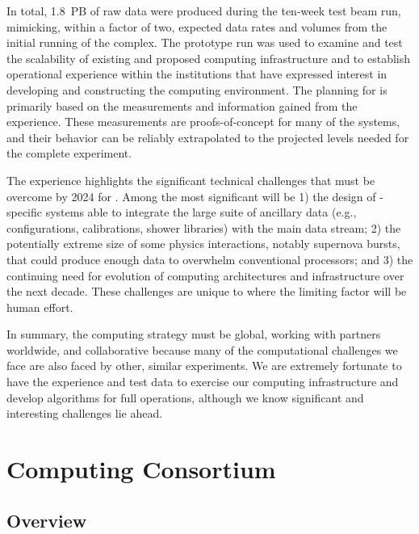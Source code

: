 In total, \SI{1.8}{PB} of raw data were produced during the ten-week test beam run, mimicking, within a factor of two, expected data rates and volumes from the initial running of the  complex.  The prototype run was used to examine and test the scalability of existing and proposed computing infrastructure and to establish operational experience within the institutions that have expressed interest in developing and constructing the  computing environment.  The planning for  is primarily based on the measurements and information gained from the  experience.  These measurements are proofs-of-concept for many of the systems, and their behavior can be reliably extrapolated to the projected levels needed for the complete  experiment. 

The  experience highlights the significant technical challenges that must be overcome by 2024 for . Among the most significant will be  1) the design of -specific systems able to integrate the large suite of ancillary data (e.g., configurations, calibrations, shower libraries) with the main  data stream; 2) the potentially extreme size of some physics interactions, notably supernova bursts, that could produce enough data to overwhelm conventional processors; and 3) the continuing need for evolution of computing architectures and infrastructure over the next decade. These challenges %
are unique to  where the limiting factor will be human effort. 

In summary, the  computing strategy must be global, working with partners worldwide, and collaborative because many of the computational challenges we face are also %
faced by other, similar experiments.  We are extremely fortunate to have the  experience and test data to exercise our computing infrastructure and develop algorithms for full  operations, although we know significant and interesting challenges lie ahead. 
 
\section{Computing Consortium}
\subsection{Overview}
\label{ch:exec-comp-ovr}

